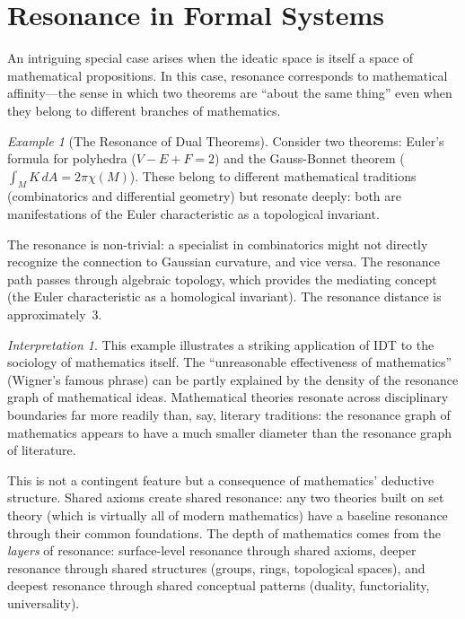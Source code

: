 \documentclass[11pt,openany]{book}
\theoremstyle{definition}
\theoremstyle{plain}
\theoremstyle{remark}
\newtheorem{example}[axiom]{Example}
\newtheorem{interpretation}[axiom]{Interpretation}
\begin{document}
\section{Resonance in Formal Systems}

An intriguing special case arises when the ideatic space is itself a space of mathematical propositions. In this case, resonance corresponds to mathematical affinity---the sense in which two theorems are ``about the same thing'' even when they belong to different branches of mathematics.

\begin{example}[The Resonance of Dual Theorems]
Consider two theorems: Euler's formula for polyhedra ($V - E + F = 2$) and the Gauss-Bonnet theorem ($\int_M K\, dA = 2\pi\chi(M)$). These belong to different mathematical traditions (combinatorics and differential geometry) but resonate deeply: both are manifestations of the Euler characteristic as a topological invariant.

The resonance is non-trivial: a specialist in combinatorics might not directly recognize the connection to Gaussian curvature, and vice versa. The resonance path passes through algebraic topology, which provides the mediating concept (the Euler characteristic as a homological invariant). The resonance distance is approximately~3.
\end{example}

\begin{interpretation}
This example illustrates a striking application of IDT to the sociology of mathematics itself. The ``unreasonable effectiveness of mathematics'' (Wigner's famous phrase) can be partly explained by the density of the resonance graph of mathematical ideas. Mathematical theories resonate across disciplinary boundaries far more readily than, say, literary traditions: the resonance graph of mathematics appears to have a much smaller diameter than the resonance graph of literature.

This is not a contingent feature but a consequence of mathematics' deductive structure. Shared axioms create shared resonance: any two theories built on set theory (which is virtually all of modern mathematics) have a baseline resonance through their common foundations. The depth of mathematics comes from the \emph{layers} of resonance: surface-level resonance through shared axioms, deeper resonance through shared structures (groups, rings, topological spaces), and deepest resonance through shared conceptual patterns (duality, functoriality, universality).
\end{interpretation}
\end{document}
